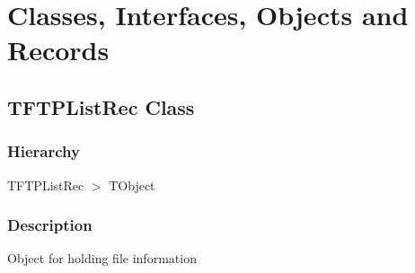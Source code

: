 \documentclass{report}
\newif\ifpdf
\begin{document}
\section{Classes, Interfaces, Objects and Records}
\ifpdf
\subsection*{\large{\textbf{TFTPListRec Class}}\normalsize\hspace{1ex}\hrulefill}
\else
\subsection*{TFTPListRec Class}
\fi
\label{ftpsend.TFTPListRec}
\subsubsection*{\large{\textbf{Hierarchy}}\normalsize\hspace{1ex}\hfill}
TFTPListRec {$>$} TObject
\subsubsection*{\large{\textbf{Description}}\normalsize\hspace{1ex}\hfill}
Object for holding file information\hfill\vspace*{1ex}
\end{document}
